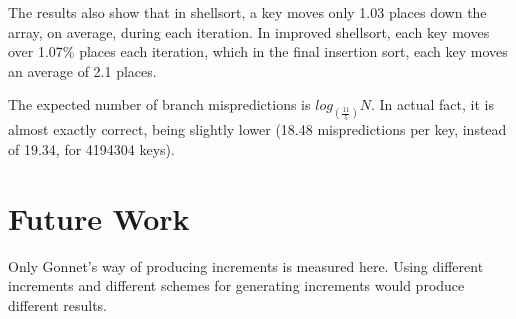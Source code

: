 The results also show that in shellsort, a key moves only 1.03 places down the
array, on average, during each iteration. In improved shellsort, each key moves
over 1.07\% places each iteration, which in the final insertion sort, each key
moves an average of 2.1 places.

The expected number of branch mispredictions is $log_{(\frac{11}{5})}N$. In
actual fact, it is almost exactly correct, being slightly lower (18.48
mispredictions per key, instead of 19.34, for 4194304 keys).


\section{Future Work}
Only Gonnet's way of producing increments is measured here. Using different
increments and different schemes for generating increments would produce
different results. 
